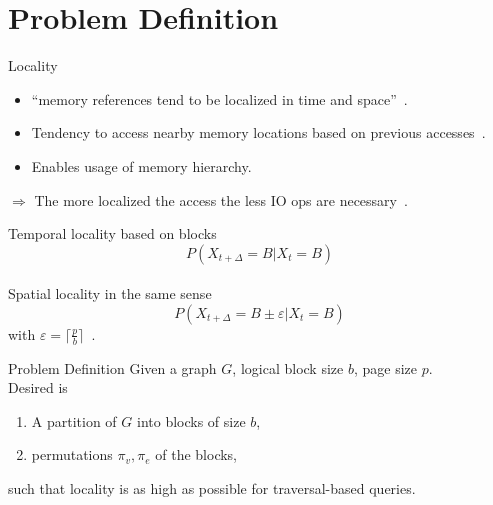 \documentclass[rgb]{beamer}
\begin{document}
\section{Problem Definition}
    \begin{frame}[allowframebreaks]{Locality}
            \begin{itemize}
                \item  ``memory references tend to be localized in time and space''~\autocite{jacob2010memory}. \\ [2em]
                \item Tendency to access nearby memory locations based on previous accesses~\autocite{denning2006locality}. \\ [2em]
                \item Enables usage of memory hierarchy. \\ [3em]
            \end{itemize}
            
            $\Rightarrow$ The more localized the access the less IO ops are necessary~\autocite{gupta2013locality}.

         \framebreak
            Temporal locality based on blocks 
                \[ P (X_{t + \Delta} = B | X_t = B) \] \\ [2em]
            Spatial locality in the same sense 
                \[ P(X_{t + \Delta} = B \pm \varepsilon | X_t = B) \] 
                with $\varepsilon = \lceil \frac{p}{b} \rceil$~\autocite{gupta2013locality}.
          
        \end{frame}

     \begin{frame}{Problem Definition}
            Given a graph $G$, logical block size $b$, page size $p$. \\ [2em]
            Desired is \\ [1em]
            \begin{enumerate}
            \item A partition of $G$ into blocks of size $b$, \\ [1em]
            \item permutations $\pi_v, \pi_e$ of the blocks,\\ [1.5em]
            \end{enumerate}
            such that locality is as high as possible for traversal-based queries.
    \end{frame}
    
\end{document}
